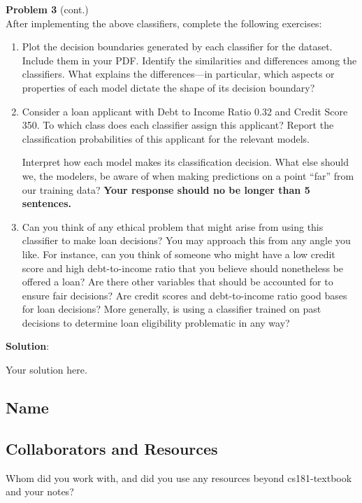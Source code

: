\documentclass[submit]{../harvardml}
\newenvironment{solution}{
    \vspace{2mm}
    \color{blue}\noindent\textbf{Solution}:
}{}
\begin{document}
\begin{framed}
  \noindent\textbf{Problem 3} (cont.)\\

After implementing the above classifiers, complete the following exercises:
  \begin{enumerate}



      \item Plot the decision boundaries generated by each classifier for the dataset. Include them in your PDF.
            Identify the similarities and differences among the classifiers. What explains the differences---in particular, which aspects or properties of each model dictate the shape of its decision boundary?
    
      \item
    
            Consider a loan applicant with Debt to Income Ratio 0.32 and Credit Score 350. To which class does each classifier assign this applicant? Report the classification probabilities of this applicant for the relevant models.
    
            Interpret how each model makes its classification decision. What else should we, the modelers, be aware of when making predictions on a point “far” from our training data? \textbf{Your response should no be longer than 5 sentences.}

    \item
        Can you think of any ethical problem that might arise from using this classifier to make loan decisions? You may approach this from any angle you like. For instance, can you think of someone who might have a low credit score and high debt-to-income ratio that you believe should nonetheless be offered a loan? Are there other variables that should be accounted for to ensure fair decisions? Are credit scores and debt-to-income ratio good bases for loan decisions? More generally, is using a classifier trained on past decisions to determine loan eligibility problematic in any way?
    \end{enumerate}
\end{framed}

\newpage

\begin{solution}
	Your solution here.
\end{solution}

\newpage
\subsection*{Name}

\subsection*{Collaborators and Resources}
Whom did you work with, and did you use any resources beyond cs181-textbook and your notes?
\end{document}
